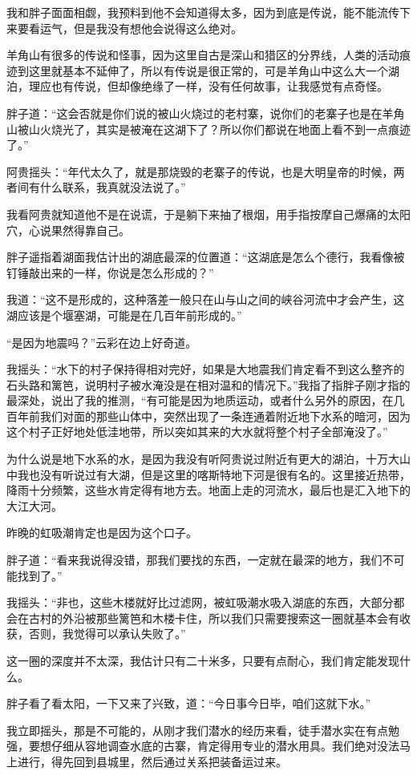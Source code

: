 我和胖子面面相觑，我预料到他不会知道得太多，因为到底是传说，能不能流传下来要看运气，但是我没有想他会说得这么绝对。

羊角山有很多的传说和怪事，因为这里自古是深山和猎区的分界线，人类的活动痕迹到这里就基本不延伸了，所以有传说是很正常的，可是羊角山中这么大一个湖泊，理应也有传说，但却像绝缘了一样，没有任何故事，让我感觉有点奇怪。

胖子道：“这会否就是你们说的被山火烧过的老村寨，说你们的老寨子也是在羊角山被山火烧光了，其实是被淹在这湖下了？所以你们都说在地面上看不到一点痕迹了。”

阿贵摇头：“年代太久了，就是那烧毁的老寨子的传说，也是大明皇帝的时候，两者间有什么联系，我真就没法说了。”

我看阿贵就知道他不是在说谎，于是躺下来抽了根烟，用手指按摩自己爆痛的太阳穴，心说果然得靠自己。

胖子遥指着湖面我估计出的湖底最深的位置道：“这湖底是怎么个德行，我看像被钉锤敲出来的一样，你说是怎么形成的？”

我道：“这不是形成的，这种落差一般只在山与山之间的峡谷河流中才会产生，这湖应该是个堰塞湖，可能是在几百年前形成的。”

“是因为地震吗？”云彩在边上好奇道。

我摇头：“水下的村子保持得相对完好，如果是大地震我们肯定看不到这么整齐的石头路和篱笆，说明村子被水淹没是在相对温和的情况下。”我指了指胖子刚才指的最深处，说出了我的推测，“有可能是因为地质运动，或者什么另外的原因，在几百年前我们对面的那些山体中，突然出现了一条连通着附近地下水系的暗河，因为这个村子正好地处低洼地带，所以突如其来的大水就将整个村子全部淹没了。”

为什么说是地下水系的水，是因为我没有听阿贵说过附近有更大的湖泊，十万大山中我也没有听说过有大湖，但是这里的喀斯特地下河是很有名的。这里接近热带，降雨十分频繁，这些水肯定得有地方去。地面上走的河流水，最后也是汇入地下的大江大河。

昨晚的虹吸潮肯定也是因为这个口子。

胖子道：“看来我说得没错，那我们要找的东西，一定就在最深的地方，我们不可能找到了。”

我摇头：“非也，这些木楼就好比过滤网，被虹吸潮水吸入湖底的东西，大部分都会在古村的外沿被那些篱笆和木楼卡住，所以我们只需要搜索这一圈就基本会有收获，否则，我觉得可以承认失败了。”

这一圈的深度并不太深，我估计只有二十米多，只要有点耐心，我们肯定能发现什么。

胖子看了看太阳，一下又来了兴致，道：“今日事今日毕，咱们这就下水。”

我立即摇头，那是不可能的，从刚才我们潜水的经历来看，徒手潜水实在有点勉强，要想仔细从容地调查水底的古寨，肯定得用专业的潜水用具。我们绝对没法马上进行，得先回到县城里，然后通过关系把装备运过来。

